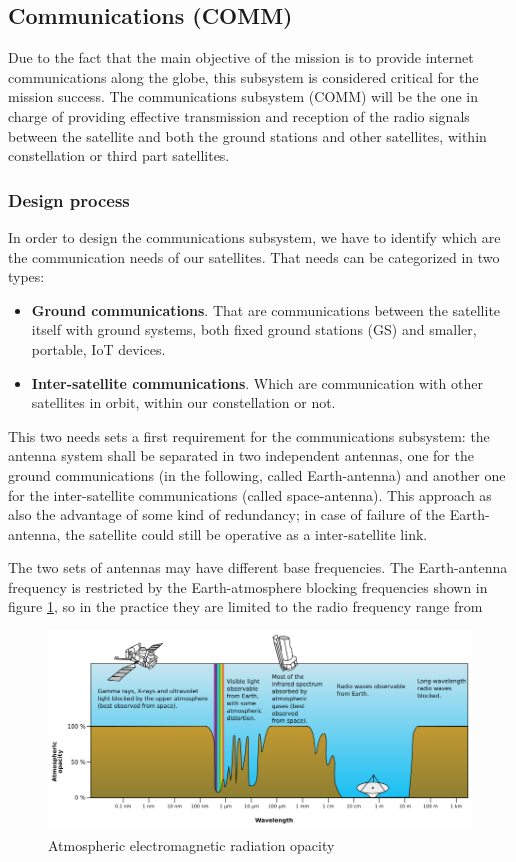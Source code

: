 \subsection{Communications (COMM)}
Due to the fact that the main objective of the mission is to provide internet
communications along the globe, this subsystem is considered critical for the
mission success. The communications subsystem (COMM) will be the one in charge
of providing effective transmission and reception of the radio signals between the
satellite and both the ground stations and other satellites, within \MissionName
constellation or third part satellites.

\subsubsection{Design process}
In order to design the communications subsystem, we have to identify which are
the communication needs of our satellites. That needs can be categorized in two types:

\begin{itemize}
	\item \textbf{Ground communications}. That are communications between the
	satellite itself with ground systems, both fixed ground stations (GS) and
	smaller, portable, IoT devices.
	\item \textbf{Inter-satellite communications}. Which are communication
	with other satellites in orbit, within our constellation or not.
\end{itemize}

This two needs sets a first requirement for the communications subsystem:
the antenna system shall be separated in two independent antennas, one for the
ground communications (in the following, called Earth-antenna) and another one for
the inter-satellite communications (called space-antenna). This approach as also the
advantage of some kind of redundancy; in case of failure of the Earth-antenna, the
satellite could still be operative as a inter-satellite link.

The two sets of antennas may have different base frequencies. The Earth-antenna
frequency is restricted by the Earth-atmosphere blocking frequencies shown in
figure \ref{fig:frequency_atmosphere_opacity}, so in the practice they are limited
to the radio frequency range from

\begin{figure}[h]
	\centering
	\includegraphics[width=\textwidth]{img/earth_freq.png}
	\caption{Atmospheric electromagnetic radiation opacity}
	\label{fig:frequency_atmosphere_opacity}
\end{figure}
